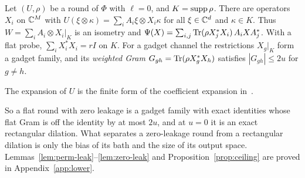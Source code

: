 \begin{lemma}\label{lem:zero-leak}
Let $(U,\rho)$ be a round of $\Phi$ with $\ell=0$, and $K=\operatorname{supp}\rho$. There are operators $X_i$ on $\mathbb C^M$ with
$U(\xi\otimes\kappa)=\sum_iA_i\xi\otimes X_i\kappa$ for all $\xi\in\mathbb C^d$ and $\kappa\in K$. Thus $W=\sum_iA_i\otimes X_i|_K$ is an isometry
and $\Psi(X)=\sum_{i,j}\operatorname{Tr}(\rho X_j^*X_i)\,A_iXA_j^*$. With a flat probe, $\sum_iX_i^*X_i=rI$ on $K$. For a gadget channel the restrictions
$X_g|_K$ form a gadget family, and its \emph{weighted Gram} $G_{gh}=\operatorname{Tr}(\rho X_g^*X_h)$ satisfies $|G_{gh}|\le2u$ for $g\ne h$.
\end{lemma}

The expansion of $U$ is the finite form of the coefficient expansion in~\cite[Theorem~2.2]{HaagerupMusat2011}.

So a flat round with zero leakage is a gadget family with exact identities whose flat Gram is off the identity by at most $2u$, and at $u=0$ it
is an exact rectangular dilation. What separates a zero-leakage round from a rectangular dilation is only the bias of its bath and the size of
its output space. Lemmas~\ref{lem:perm-leak}--\ref{lem:zero-leak} and Proposition~\ref{prop:ceiling} are proved in Appendix~\ref{app:lower}.
